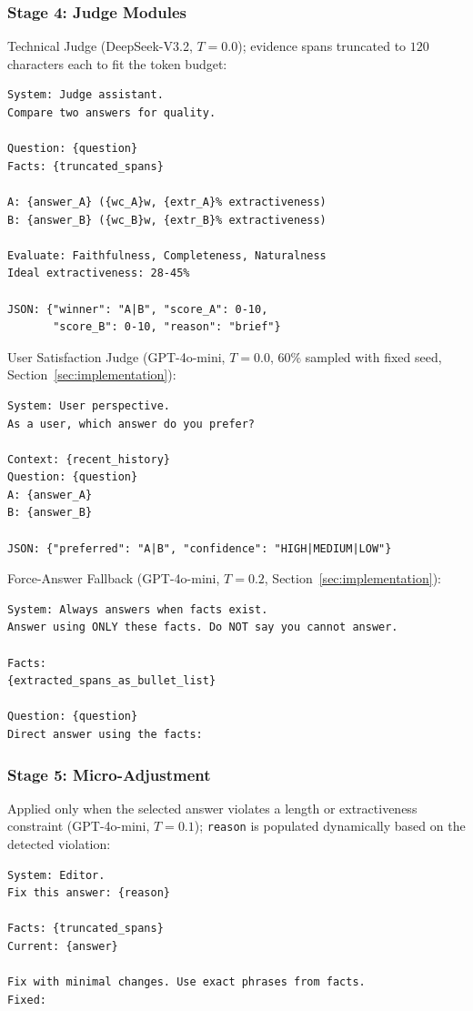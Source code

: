 \subsubsection{Stage 4: Judge Modules}
Technical Judge (DeepSeek-V3.2, $T{=}0.0$); evidence spans truncated to $120$ characters each to fit the token budget:
\begin{verbatim}
System: Judge assistant.
Compare two answers for quality.

Question: {question}
Facts: {truncated_spans}

A: {answer_A} ({wc_A}w, {extr_A}% extractiveness)
B: {answer_B} ({wc_B}w, {extr_B}% extractiveness)

Evaluate: Faithfulness, Completeness, Naturalness
Ideal extractiveness: 28-45%

JSON: {"winner": "A|B", "score_A": 0-10, 
       "score_B": 0-10, "reason": "brief"}
\end{verbatim}
User Satisfaction Judge (GPT-4o-mini, $T{=}0.0$, $60\%$ sampled with fixed seed, Section~\ref{sec:implementation}):
\begin{verbatim}
System: User perspective.
As a user, which answer do you prefer?

Context: {recent_history}
Question: {question}
A: {answer_A}
B: {answer_B}

JSON: {"preferred": "A|B", "confidence": "HIGH|MEDIUM|LOW"}
\end{verbatim}
Force-Answer Fallback (GPT-4o-mini, $T{=}0.2$, Section~\ref{sec:implementation}):
\begin{verbatim}
System: Always answers when facts exist.
Answer using ONLY these facts. Do NOT say you cannot answer.

Facts:
{extracted_spans_as_bullet_list}

Question: {question}
Direct answer using the facts:
\end{verbatim}

\subsubsection{Stage 5: Micro-Adjustment}
Applied only when the selected answer violates a length or extractiveness constraint (GPT-4o-mini, $T{=}0.1$); \texttt{reason} is populated dynamically based on the detected violation:
\begin{verbatim}
System: Editor.
Fix this answer: {reason}

Facts: {truncated_spans}
Current: {answer}

Fix with minimal changes. Use exact phrases from facts.
Fixed:
\end{verbatim}


